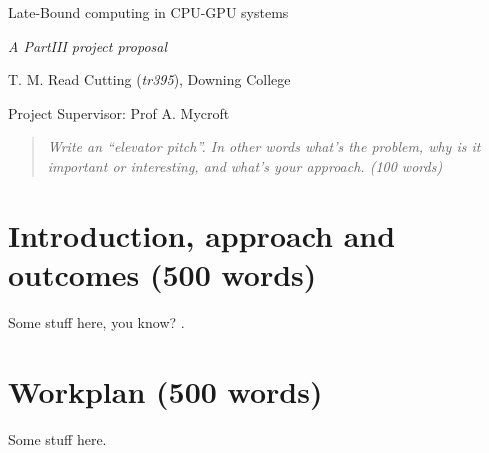 \documentclass[11pt]{article}
\begin{document}
\centerline{\Large Late-Bound computing in CPU-GPU systems}
\vspace{2em}
\centerline{\Large \emph{A PartIII project proposal}}
\vspace{2em}
\centerline{\large T. M. Read Cutting (\emph{tr395}), Downing College}
\vspace{1em}
\centerline{\large Project Supervisor: Prof A. Mycroft}
\vspace{1em}

\begin{abstract}

\textsl{Write an ``elevator pitch''. In other words what's the problem, why is
it important or interesting, and what's your approach. (100 words)}

\end{abstract}

\section{Introduction, approach and outcomes (500 words)}

Some stuff here, you know? \cite{Theano2016}.

\section{Workplan (500 words)}

Some stuff here.




\newpage
\appendix
\end{document}
